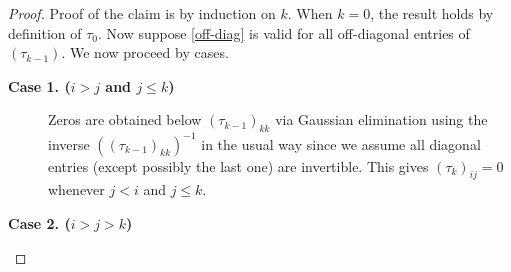 \documentclass[10pt,a4paper]{amsart}
\begin{document}
\begin{proof}
Proof of the claim is by induction on $k$.  When $k=0$, the result holds by definition of $\tau_0$.  Now suppose \eqref{off-diag} is valid for all off-diagonal entries of $(\tau_{k-1})$.   
We now proceed by cases.

\begin{description}
\item [{\bf Case 1. ($i>j$ and $j\le k$)}]
Zeros are obtained below $(\tau_{k-1})_{kk}$ via Gaussian elimination using the inverse $((\tau_{k-1})_{kk})^{-1}$ in the usual way since we assume all diagonal entries (except possibly the last one) are invertible.  This gives $(\tau_k)_{ij}=0$ whenever $j<i$ and $j\le k$.
\end{description}

\begin{description}
\item [{\bf Case 2. ($i>j> k$)}]


\end{description}
\end{proof}
\end{document}
